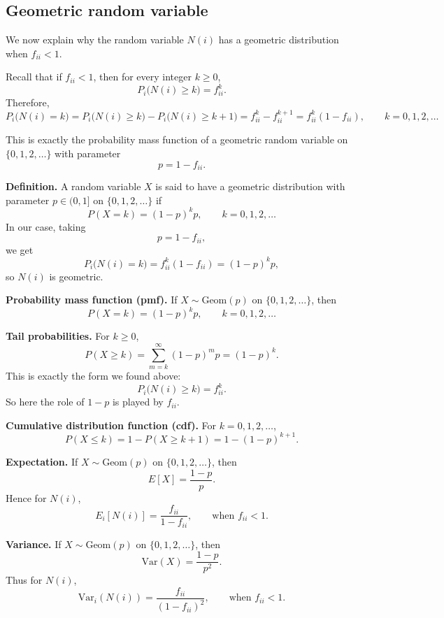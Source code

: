 \documentclass[11pt]{article}
\theoremstyle{definition}
\begin{document}
\subsection{Geometric random variable}

We now explain why the random variable \(N(i)\) has a geometric distribution when \(f_{ii}<1\).

Recall that if \(f_{ii}<1\), then for every integer \(k\ge 0\),
\[
P_i\bigl(N(i)\ge k\bigr)=f_{ii}^k.
\]
Therefore,
\[
P_i\bigl(N(i)=k\bigr)
=
P_i\bigl(N(i)\ge k\bigr)-P_i\bigl(N(i)\ge k+1\bigr)
=
f_{ii}^k-f_{ii}^{k+1}
=
f_{ii}^k(1-f_{ii}),
\qquad k=0,1,2,\dots
\]

This is exactly the probability mass function of a geometric random variable on
\(\{0,1,2,\dots\}\) with parameter
\[
p=1-f_{ii}.
\]

\medskip

\noindent
\textbf{Definition.}
A random variable \(X\) is said to have a geometric distribution with parameter \(p\in(0,1]\) on
\(\{0,1,2,\dots\}\) if
\[
P(X=k)=(1-p)^k p,\qquad k=0,1,2,\dots
\]
In our case, taking
\[
p=1-f_{ii},
\]
we get
\[
P_i\bigl(N(i)=k\bigr)=f_{ii}^k(1-f_{ii})=(1-p)^k p,
\]
so \(N(i)\) is geometric.

\medskip

\noindent
\textbf{Probability mass function (pmf).}
If \(X\sim \mathrm{Geom}(p)\) on \(\{0,1,2,\dots\}\), then
\[
P(X=k)=(1-p)^k p,\qquad k=0,1,2,\dots
\]

\medskip

\noindent
\textbf{Tail probabilities.}
For \(k\ge 0\),
\[
P(X\ge k)=\sum_{m=k}^{\infty}(1-p)^m p=(1-p)^k.
\]
This is exactly the form we found above:
\[
P_i\bigl(N(i)\ge k\bigr)=f_{ii}^k.
\]
So here the role of \(1-p\) is played by \(f_{ii}\).

\medskip

\noindent
\textbf{Cumulative distribution function (cdf).}
For \(k=0,1,2,\dots\),
\[
P(X\le k)=1-P(X\ge k+1)=1-(1-p)^{k+1}.
\]

\medskip

\noindent
\textbf{Expectation.}
If \(X\sim \mathrm{Geom}(p)\) on \(\{0,1,2,\dots\}\), then
\[
E[X]=\frac{1-p}{p}.
\]
Hence for \(N(i)\),
\[
E_i[N(i)]
=
\frac{f_{ii}}{1-f_{ii}},
\qquad \text{when } f_{ii}<1.
\]

\medskip

\noindent
\textbf{Variance.}
If \(X\sim \mathrm{Geom}(p)\) on \(\{0,1,2,\dots\}\), then
\[
\mathrm{Var}(X)=\frac{1-p}{p^2}.
\]
Thus for \(N(i)\),
\[
\mathrm{Var}_i(N(i))
=
\frac{f_{ii}}{(1-f_{ii})^2},
\qquad \text{when } f_{ii}<1.
\]
\end{document}
